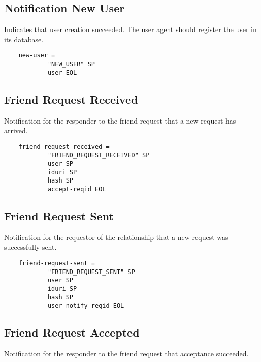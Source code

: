 \documentclass[letterpaper,11pt,oneside]{article}
\begin{document}
\subsection{Notification New User}

Indicates that user creation succeeded. The user agent should register the user
in its database.

\vspace{10pt}
\begin{verbatim}
    new-user =
            "NEW_USER" SP
            user EOL
\end{verbatim}
\vspace{10pt}

\subsection{Friend Request Received}

Notification for the responder to the friend request that a new request has
arrived.

\vspace{10pt}
\begin{verbatim}
    friend-request-received =
            "FRIEND_REQUEST_RECEIVED" SP
            user SP
            iduri SP
            hash SP
            accept-reqid EOL
\end{verbatim}
\vspace{10pt}

\subsection{Friend Request Sent}

Notification for the requestor of the relationship that a new request was
successfully sent.

\vspace{10pt}
\begin{verbatim}
    friend-request-sent =
            "FRIEND_REQUEST_SENT" SP
            user SP
            iduri SP
            hash SP
            user-notify-reqid EOL
\end{verbatim}
\vspace{10pt}

\subsection{Friend Request Accepted}

Notification for the responder to the friend request that acceptance succeeded.
\end{document}
